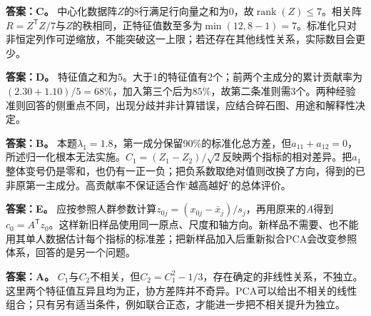 \textbf{答案：C。} 中心化数据阵$Z$的8行满足行向量之和为0，故$\operatorname{rank}(Z)\leqslant7$。相关阵$R=Z^{\mathsf T}Z/7$与$Z$的秩相同，正特征值数至多为$\min(12,8-1)=7$。标准化只对非恒定列作可逆缩放，不能突破这一上限；若还存在其他线性关系，实际数目会更少。
\par\nobreak\smallskip{}

\textbf{答案：D。} 特征值之和为5。大于1的特征值有2个；前两个主成分的累计贡献率为$(2.30+1.10)/5=68\%$，加入第三个后为$85\%$，故第二条准则需3个。两种经验准则回答的侧重点不同，出现分歧并非计算错误，应结合碎石图、用途和解释性决定。
\par\nobreak\smallskip{}

\textbf{答案：B。} 本题$\lambda_1=1.8$，第一成分保留90\%的标准化总方差，但$a_{11}+a_{12}=0$，所述归一化根本无法实施。$C_1=(Z_1-Z_2)/\sqrt2$反映两个指标的相对差异。把$a_1$整体变号仍是零和，也仍有一正一负；把负系数取绝对值则改换了方向，得到的已非原第一主成分。高贡献率不保证适合作‘越高越好’的总体评价。
\par\nobreak\smallskip{}

\textbf{答案：E。} 应按参照人群参数计算$z_{0j}=(x_{0j}-\bar x_j)/s_j$，再用原来的$A$得到$c_0=A^{\mathsf T}z_0$。这样新旧样品使用同一原点、尺度和轴方向。新样品不需要、也不能用其单人数据估计每个指标的标准差；把新样品加入后重新拟合PCA会改变参照体系，回答的是另一个问题。
\par\nobreak\smallskip{}

\textbf{答案：A。} $C_1$与$C_2$不相关，但$C_2=C_1^2-1/3$，存在确定的非线性关系，不独立。这里两个特征值互异且均为正，协方差阵并不奇异。PCA可以给出不相关的线性组合；只有另有适当条件，例如联合正态，才能进一步把不相关提升为独立。
\par\nobreak\smallskip{}


